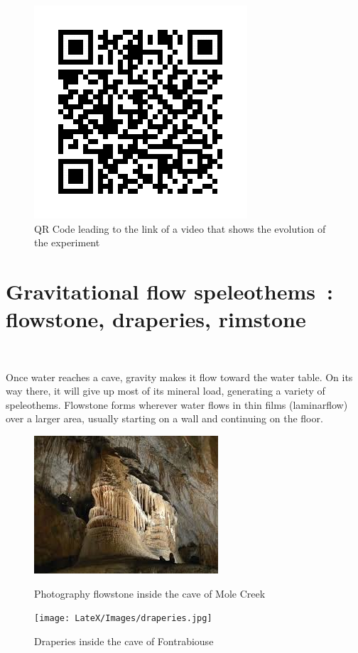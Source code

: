 \documentclass[draft, final]{report}
\begin{document}
\begin{figure}[!ht]
  \centering
  \includegraphics[scale=1]{LateX/Images/frame.png}
  \caption{QR Code leading to the link of a video that shows the evolution of the experiment}
\end{figure}
\clearpage

\chapter{Gravitational flow speleothems : flowstone, draperies, rimstone}
~\par
Once water reaches  a cave, gravity makes it flow toward the water table.  On its way there, it will give up most of its mineral load, generating a variety of speleothems. Flowstone forms wherever water flows in thin films (laminarflow) over a larger area, usually starting on a wall and continuing on the floor.\\
\begin{figure}[!ht]
  \begin{minipage}[c]{0.50\linewidth}
    \centering
    \includegraphics[scale=0.8]{LateX/Images/flowstone.jpg}
    \caption{Photography flowstone inside the cave of Mole Creek\cite{flowstone}}
  \end{minipage}\hfill%
  \begin{minipage}[c]{0.50\linewidth}
    \centering
    \texttt{[image: LateX/Images/draperies.jpg]}
    \caption{Draperies inside the cave of Fontrabiouse}
  \end{minipage}
\end{figure}
\clearpage
\end{document}
